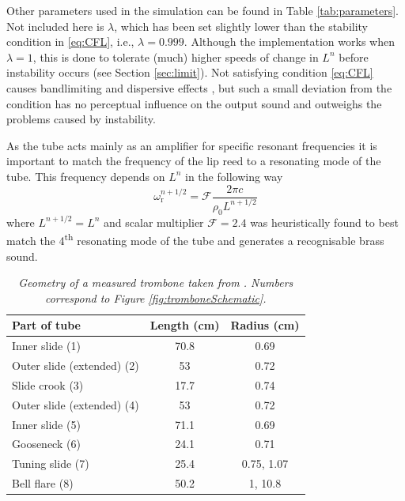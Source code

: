 Other parameters used in the simulation can be found in Table \ref{tab:parameters}. Not included here is $\lambda$, which has been set slightly lower than the stability condition in \eqref{eq:CFL}, i.e., $\lambda = 0.999$. Although the implementation works when $\lambda = 1$, this is done to tolerate (much) higher speeds of change in $L^n$ before instability occurs (see Section \ref{sec:limit}). Not satisfying condition \eqref{eq:CFL} causes bandlimiting and dispersive effects \cite{bilbao2009}, but such a small deviation from the condition has no perceptual influence on the output sound and outweighs the problems caused by instability.

As the tube acts mainly as an amplifier for specific resonant frequencies it is important to match the frequency of the lip reed to a resonating mode of the tube. This frequency depends on $L^n$ in the following way
\begin{equation}\label{eq:lipReedCalc}
    \omega_\text{r}^{n+1/2} = \mathcal{F}\frac{2\pi c}{\rho_0 L^{n+1/2}}
\end{equation}
where $L^{n+1/2} = L^n$ and scalar multiplier $\mathcal{F} = 2.4$ was heuristically found to best match the 4\textsuperscript{th} resonating mode of the tube and generates a recognisable brass sound.

\begin{table}[t]
    \small
    \begin{center}
    \caption{\it Geometry of a measured trombone taken from \cite{Smyth2011}. Numbers correspond to Figure \ref{fig:tromboneSchematic}.\label{tab:geometry}}
    \begin{tabular}{|l|c|c|}
        \hline
        Part of tube & Length (cm) & Radius (cm)\\\hline
        Inner slide (1) & 70.8 & 0.69\\
        Outer slide (extended) (2) & 53 & 0.72 
        \\
        Slide crook (3)& 17.7 & 0.74\\
        Outer slide (extended) (4) & 53 & 0.72 
        \\
        Inner slide (5) & 71.1 & 0.69\\
        Gooseneck (6) & 24.1 & 0.71\\
        Tuning slide (7) & 25.4 & 0.75, 1.07\\
        Bell flare (8) & 50.2& 1, 10.8\\\hline
    \end{tabular}
    \end{center}
\end{table}

